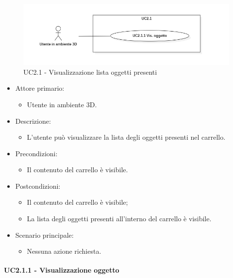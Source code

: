 \begin{figure}[H]
  \renewcommand{\thefigure}{3}
  \includegraphics[width=\linewidth]{./res/images/UC2.1.png}
  \caption{UC2.1 - Visualizzazione lista oggetti presenti}
  \label{fig:UC 2.1}
\end{figure}

\begin{itemize}
	
	\item Attore primario: 
	\begin{itemize}
		\item Utente in ambiente 3D.
	\end{itemize}
	\item Descrizione:
	\begin{itemize}
		\item L'utente può visualizzare la lista degli oggetti presenti nel carrello.
	\end{itemize}
	
	\item Precondizioni:
	\begin{itemize}
		\item Il contenuto del carrello è visibile.
	\end{itemize}
	
	\item Postcondizioni:
	\begin{itemize}
		\item Il contenuto del carrello è visibile;
		\item La lista degli oggetti presenti all'interno del carrello è visibile.
	\end{itemize}
	
	\item Scenario principale:
	\begin{itemize}
		\item Nessuna azione richiesta.
	\end{itemize}
	
\end{itemize}

\paragraph{UC2.1.1 - Visualizzazione oggetto}

